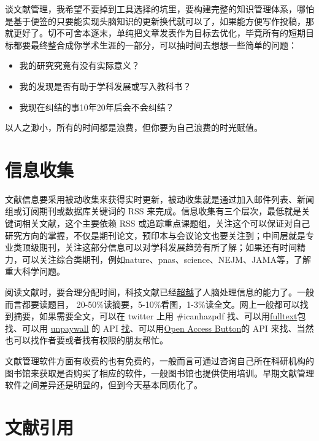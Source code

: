 \documentclass[]{tufte-book}
\providecommand{\tightlist}{%
  \setlength{\itemsep}{0pt}\setlength{\parskip}{0pt}}
\begin{document}
谈文献管理，我希望不要掉到工具选择的坑里，要构建完整的知识管理体系，哪怕是基于便签的只要能实现头脑知识的更新换代就可以了，如果能方便写作投稿，那就更好了。切不可舍本逐末，单纯把文章发表作为目标去优化，毕竟所有的短期目标都要最终整合成你学术生涯的一部分，可以抽时间去想想一些简单的问题：

\begin{itemize}
\tightlist
\item
  我的研究究竟有没有实际意义？
\item
  我的发现是否有助于学科发展或写入教科书？
\item
  我现在纠结的事10年20年后会不会纠结？
\end{itemize}

以人之渺小，所有的时间都是浪费，但你要为自己浪费的时光赋值。

\hypertarget{ux4fe1ux606fux6536ux96c6}{%
\section{信息收集}\label{ux4fe1ux606fux6536ux96c6}}

文献信息要采用被动收集来获得实时更新，被动收集就是通过加入邮件列表、新闻组或订阅期刊或数据库关键词的 RSS 来完成。信息收集有三个层次，最低就是关键词相关文献，这个主要依赖 RSS 或追踪重点课题组，关注这个可以保证对自己研究方向的掌握，不仅是期刊论文，预印本与会议论文也要关注到；中间层就是专业类顶级期刊，关注这部分信息可以对学科发展趋势有所了解；如果还有时间精力，可以关注综合类期刊，例如nature、pnas、science、NEJM、JAMA等，了解重大科学问题。

阅读文献时，要合理分配时间，科技文献已经\href{https://www.alternet.org/news-amp-politics/science-has-outgrown-human-mind-and-its-limited-capacities-process-information}{超越}了人脑处理信息的能力了。一般而言都要读题目， 20-50\%读摘要，5-10\%看图，1-3\%读全文。网上一般都可以找到摘要，如果需要全文，可以在 twitter 上用 \#icanhazpdf 找、可以用\href{https://github.com/ropensci/fulltext}{fulltext}包找、可以用 \href{https://unpaywall.org/}{unpaywall} 的 API \href{https://cran.r-project.org/web/packages/roadoi/vignettes/intro.html}{找}、可以用\href{https://openaccessbutton.org/}{Open Access Button}的 API 来找、当然也可以找作者要或者找有权限的朋友帮忙。

文献管理软件方面有收费的也有免费的，一般而言可通过咨询自己所在科研机构的图书馆来获取是否购买了相应的软件，一般图书馆也提供使用培训。早期文献管理软件之间差异还是明显的，但到今天基本同质化了。

\hypertarget{ux6587ux732eux5f15ux7528}{%
\section{文献引用}\label{ux6587ux732eux5f15ux7528}}
\end{document}
